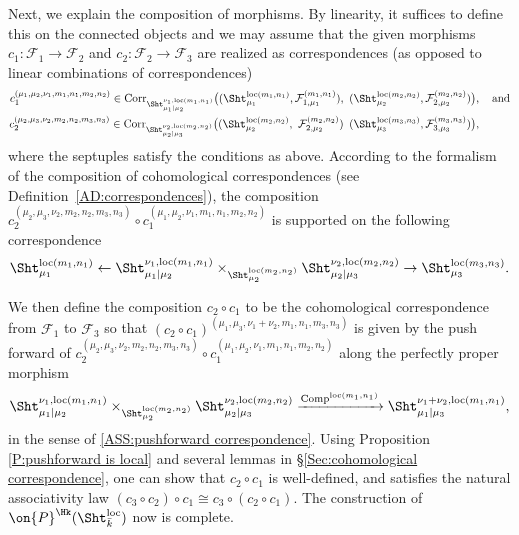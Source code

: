 \documentclass[11pt]{amsart}
\theoremstyle{definition}
\theoremstyle{definition}
\theoremstyle{definition}
\numberwithin{equation}{subsection}
\def\calF{\mathcal{F}}
\newcommand{\loc}{\mathrm{loc}}
\begin{document}
Next, we explain the composition of morphisms. By linearity, it suffices to define this on the connected objects and we may assume that the given morphisms $c_1: \calF_1 \to \calF_2$ and $c_2: \calF_2 \to \calF_3$ are realized as correspondences (as opposed to linear combinations of correspondences)
\begin{align*}
c^{(\mu_1,\mu_2,\nu_1,m_1,n_1,m_2,n_2)}_1 \in \mathrm{Corr}_{\Sht_{\mu_1|\mu_2}^{\nu_1,\loc(m_1,n_1)}}\big( (\Sht_{\mu_1}^{\loc(m_1, n_1)}, \calF_{1,\mu_1}^{(m_1,n_1)}),\ (\Sht_{\mu_2}^{\loc(m_2, n_2)}, \calF_{2,\mu_2}^{(m_2,n_2)}) \big)&, \quad\textrm{and}\\
c^{(\mu_2,\mu_3,\nu_2,m_2,n_2,m_3,n_3)}_2 \in \mathrm{Corr}_{\Sht_{\mu_2|\mu_3}^{\nu_2,\loc(m_2,n_2)}}\big( (\Sht_{\mu_2}^{\loc(m_2, n_2)},\ \calF_{2,\mu_2}^{(m_2,n_2)}) \,\ (\Sht_{\mu_3}^{\loc(m_3, n_3)}, \calF_{3,\mu_3}^{(m_3,n_3)})\big)&,
\end{align*}
where the septuples satisfy the conditions as above.
According to the formalism of the composition of cohomological correspondences (see Definition~\ref{AD:correspondences}), the composition $c^{(\mu_2,\mu_3,\nu_2,m_2,n_2,m_3,n_3)}_2 \circ 
c^{(\mu_1,\mu_2,\nu_1,m_1,n_1,m_2,n_2)}_1$ is supported on the following correspondence
\[
\Sht_{\mu_1}^{\loc(m_1,n_1)} \leftarrow \Sht_{\mu_1|\mu_2}^{\nu_1,\loc(m_1, n_1)} \times_{ \Sht_{\mu_2}^{\loc(m_2,n_2)}}
\Sht_{\mu_2|\mu_3}^{\nu_2,\loc(m_2, n_2)}  \to  \Sht_{\mu_3}^{\loc(m_3,n_3)}.
\]



We then define the composition $c_2\circ c_1$ to be the cohomological correspondence from $\calF_1$ to $\calF_3$ so that $(c_2\circ c_1)^{(\mu_1,\mu_3,\nu_1+\nu_2,m_1,n_1,m_3,n_3)}$ is given by the push forward of $c^{(\mu_2,\mu_3,\nu_2,m_2,n_2,m_3,n_3)}_2 \circ 
c^{(\mu_1,\mu_2,\nu_1,m_1,n_1,m_2,n_2)}_1$ along the perfectly proper morphism
\[
\Sht_{\mu_1|\mu_2}^{\nu_1,\loc(m_1, n_1)} \times_{ \Sht_{\mu_2}^{\loc(m_2,n_2)}}
\Sht_{\mu_2|\mu_3}^{\nu_2,\loc(m_2, n_2)} \xrightarrow{\mathrm{Comp}^{\loc(m_1,n_1)}}\Sht_{\mu_1|\mu_3}^{\nu_1+\nu_2,\loc(m_1, n_1)},
\]
in the sense of \eqref{ASS:pushforward correspondence}. Using Proposition \ref{P:pushforward is local} and several lemmas in \S \ref{Sec:cohomological correspondence}, one can show that $c_2\circ c_1$ is well-defined, and satisfies the natural associativity law $(c_3\circ c_2) \circ c_1 \cong c_3 \circ (c_2 \circ c_1)$. The construction of $\on{P}^{\Hk}(\Sht^\loc_{\bar k})$ now is complete. 
\end{document}
